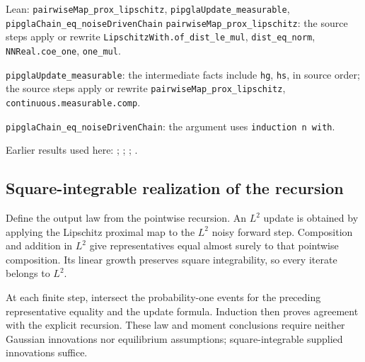 \documentclass[11pt,a4paper]{report}
\begin{document}
\begin{leanbox}{Lean: \texttt{pairwiseMap\_\allowbreak{}prox\_\allowbreak{}lipschitz}, \texttt{pipglaUpdate\_\allowbreak{}measurable}, \texttt{pipglaChain\_\allowbreak{}eq\_\allowbreak{}noiseDrivenChain}}
\texttt{pairwise\allowbreak{}Map\_\allowbreak{}prox\_\allowbreak{}lipschitz}: the source steps apply or rewrite \texttt{Lipschitz\allowbreak{}With.\allowbreak{}of\_\allowbreak{}dist\_\allowbreak{}le\_\allowbreak{}mul}, \texttt{dist\_\allowbreak{}eq\_\allowbreak{}norm}, \texttt{NNReal.\allowbreak{}coe\_\allowbreak{}one}, \texttt{one\_\allowbreak{}mul}.



\texttt{pipgla\allowbreak{}Update\_\allowbreak{}measurable}: the intermediate facts include \texttt{hg}, \texttt{hs}, in source order; the source steps apply or rewrite \texttt{pairwise\allowbreak{}Map\_\allowbreak{}prox\_\allowbreak{}lipschitz}, \texttt{continuous.\allowbreak{}measurable.\allowbreak{}comp}.



\texttt{pipgla\allowbreak{}Chain\_\allowbreak{}eq\_\allowbreak{}noise\allowbreak{}Driven\allowbreak{}Chain}: the argument uses \texttt{induction n with}.
\end{leanbox}


Earlier results used here: \cite[Section~3.20.1]{LangevinLean2026ULASC}; \cite[Section~3.1.1]{LangevinLean2026IPLA}; \cite[Section~3.1.4]{LangevinLean2026IPLA}; \cite[Section~3.1.7]{LangevinLean2026IPLA}.
\subsection{\texorpdfstring{Square-integrable realization of the recursion}{Square-integrable realization of the recursion}}
\label{report-step-ProximalLangevin-SplittingLaw-lean-2}


Define the output law from the pointwise recursion. An \(L^2\) update is obtained by applying the Lipschitz proximal map to the \(L^2\) noisy forward step. Composition and addition in \(L^2\) give representatives equal almost surely to that pointwise composition. Its linear growth preserves square integrability, so every iterate belongs to \(L^2\).



At each finite step, intersect the probability-one events for the preceding representative equality and the update formula. Induction then proves agreement with the explicit recursion. These law and moment conclusions require neither Gaussian innovations nor equilibrium assumptions; square-integrable supplied innovations suffice.
\end{document}

